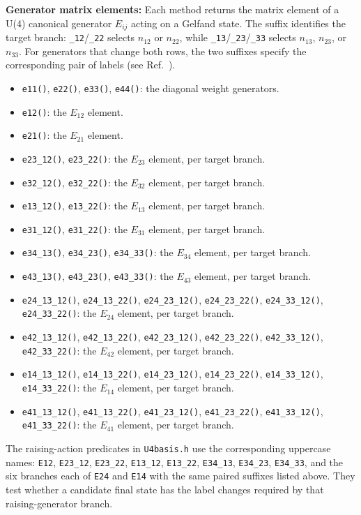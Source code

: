 \documentclass[aps,onecolumn,10pt,superscriptaddress,floatfix,nofootinbib]{revtex4}
\begin{document}
\textbf{Generator matrix elements:} Each method returns the matrix element of a
U(4) canonical generator $E_{ij}$ acting on a Gelfand state. The suffix identifies
the target branch: \verb|_12|/\verb|_22| selects $n_{12}$ or $n_{22}$, while
\verb|_13|/\verb|_23|/\verb|_33| selects $n_{13}$, $n_{23}$, or $n_{33}$.
For generators that change both rows, the two suffixes specify the corresponding
pair of labels (see Ref.~\cite{Dang2024EPJP2}).
\begin{itemize}
    \item \verb|e11()|, \verb|e22()|, \verb|e33()|, \verb|e44()|: the diagonal weight generators.
    \item \verb|e12()|: the $E_{12}$ element.
    \item \verb|e21()|: the $E_{21}$ element.
    \item \verb|e23_12()|, \verb|e23_22()|: the $E_{23}$ element, per target branch.
    \item \verb|e32_12()|, \verb|e32_22()|: the $E_{32}$ element, per target branch.
    \item \verb|e13_12()|, \verb|e13_22()|: the $E_{13}$ element, per target branch.
    \item \verb|e31_12()|, \verb|e31_22()|: the $E_{31}$ element, per target branch.
    \item \verb|e34_13()|, \verb|e34_23()|, \verb|e34_33()|: the $E_{34}$ element, per target branch.
    \item \verb|e43_13()|, \verb|e43_23()|, \verb|e43_33()|: the $E_{43}$ element, per target branch.
    \item \verb|e24_13_12()|, \verb|e24_13_22()|, \verb|e24_23_12()|, \verb|e24_23_22()|, \verb|e24_33_12()|, \verb|e24_33_22()|: the $E_{24}$ element, per target branch.
    \item \verb|e42_13_12()|, \verb|e42_13_22()|, \verb|e42_23_12()|, \verb|e42_23_22()|, \verb|e42_33_12()|, \verb|e42_33_22()|: the $E_{42}$ element, per target branch.
    \item \verb|e14_13_12()|, \verb|e14_13_22()|, \verb|e14_23_12()|, \verb|e14_23_22()|, \verb|e14_33_12()|, \verb|e14_33_22()|: the $E_{14}$ element, per target branch.
    \item \verb|e41_13_12()|, \verb|e41_13_22()|, \verb|e41_23_12()|, \verb|e41_23_22()|, \verb|e41_33_12()|, \verb|e41_33_22()|: the $E_{41}$ element, per target branch.
\end{itemize}
The raising-action predicates in \verb|U4basis.h| use the corresponding
uppercase names: \verb|E12|, \verb|E23_12|, \verb|E23_22|,
\verb|E13_12|, \verb|E13_22|, \verb|E34_13|, \verb|E34_23|,
\verb|E34_33|, and the six branches each of \verb|E24| and \verb|E14|
with the same paired suffixes listed above. They test whether a candidate final
state has the label changes required by that raising-generator branch.
\end{document}
